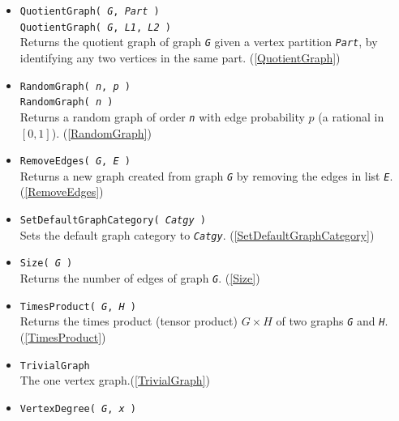 \documentclass[a4paper,11pt]{report}
\begin{document}
{{\begin{itemize}
 Returns the path graph on \mbox{\texttt{\mdseries\slshape n}} vertices. (\ref{PathGraph}) 
\item \texttt{QuotientGraph( \mbox{\texttt{\mdseries\slshape G}}, \mbox{\texttt{\mdseries\slshape Part}} )}\\
 \texttt{QuotientGraph( \mbox{\texttt{\mdseries\slshape G}}, \mbox{\texttt{\mdseries\slshape L1}}, \mbox{\texttt{\mdseries\slshape L2}} )}\\
 Returns the quotient graph of graph \mbox{\texttt{\mdseries\slshape G}} given a vertex partition \mbox{\texttt{\mdseries\slshape Part}}, by identifying any two vertices in the same part. (\ref{QuotientGraph}) 
\item \texttt{RandomGraph( \mbox{\texttt{\mdseries\slshape n}}, \mbox{\texttt{\mdseries\slshape p}} )}\\
 \texttt{RandomGraph( \mbox{\texttt{\mdseries\slshape n}} )}\\
 Returns a random graph of order \mbox{\texttt{\mdseries\slshape n}} with edge probability $p$ (a rational in $[0,1]$). (\ref{RandomGraph}) 
\item \texttt{RemoveEdges( \mbox{\texttt{\mdseries\slshape G}}, \mbox{\texttt{\mdseries\slshape E}} )}\\
 Returns a new graph created from graph \mbox{\texttt{\mdseries\slshape G}} by removing the edges in list \mbox{\texttt{\mdseries\slshape E}}. (\ref{RemoveEdges}) 
\item \texttt{SetDefaultGraphCategory( \mbox{\texttt{\mdseries\slshape Catgy}} )}\\
 Sets the default graph category to \mbox{\texttt{\mdseries\slshape Catgy}}. (\ref{SetDefaultGraphCategory}) 
\item \texttt{Size( \mbox{\texttt{\mdseries\slshape G}} )}\\
 Returns the number of edges of graph \mbox{\texttt{\mdseries\slshape G}}. (\ref{Size}) 
\item \texttt{TimesProduct( \mbox{\texttt{\mdseries\slshape G}}, \mbox{\texttt{\mdseries\slshape H}} )}\\
 Returns the times product (tensor product) $G \times H$ of two graphs \mbox{\texttt{\mdseries\slshape G}} and \mbox{\texttt{\mdseries\slshape H}}. (\ref{TimesProduct}) 
\item \texttt{TrivialGraph}\\
 The one vertex graph.(\ref{TrivialGraph}) 
\item \texttt{VertexDegree( \mbox{\texttt{\mdseries\slshape G}}, \mbox{\texttt{\mdseries\slshape x}} )}\\

\end{itemize}}}
\end{document}
